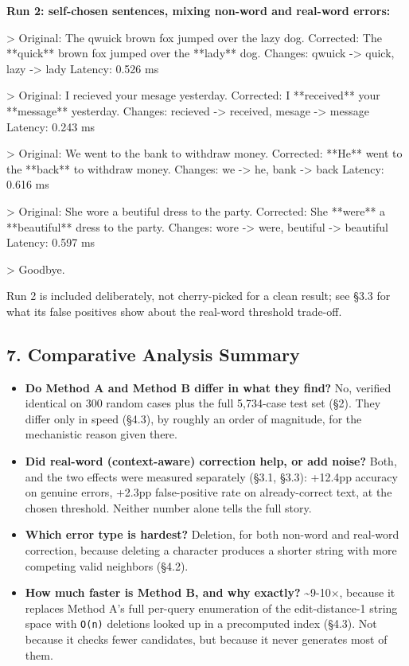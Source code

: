 \documentclass[11pt,a4paper]{article}
\begin{document}
\textbf{Run 2: self-chosen sentences, mixing non-word and real-word errors:}

\begin{codeblock}
> Original:  The qwuick brown fox jumped over the lazy dog.
Corrected: The **quick** brown fox jumped over the **lady** dog.
Changes: qwuick -> quick, lazy -> lady
Latency: 0.526 ms

> Original:  I recieved your mesage yesterday.
Corrected: I **received** your **message** yesterday.
Changes: recieved -> received, mesage -> message
Latency: 0.243 ms

> Original:  We went to the bank to withdraw money.
Corrected: **He** went to the **back** to withdraw money.
Changes: we -> he, bank -> back
Latency: 0.616 ms

> Original:  She wore a beutiful dress to the party.
Corrected: She **were** a **beautiful** dress to the party.
Changes: wore -> were, beutiful -> beautiful
Latency: 0.597 ms

> Goodbye.
\end{codeblock}

Run 2 is included deliberately, not cherry-picked for a clean result; see \S{}3.3 for what its false positives show about the real-word threshold trade-off.

\subsection*{7. Comparative Analysis Summary}

\begin{itemize}
\item \textbf{Do Method A and Method B differ in what they find?} No, verified identical on 300 random cases plus the full 5,734-case test set (\S{}2). They differ only in speed (\S{}4.3), by roughly an order of magnitude, for the mechanistic reason given there.
\item \textbf{Did real-word (context-aware) correction help, or add noise?} Both, and the two effects were measured separately (\S{}3.1, \S{}3.3): +12.4pp accuracy on genuine errors, +2.3pp false-positive rate on already-correct text, at the chosen threshold. Neither number alone tells the full story.
\item \textbf{Which error type is hardest?} Deletion, for both non-word and real-word correction, because deleting a character produces a shorter string with more competing valid neighbors (\S{}4.2).
\item \textbf{How much faster is Method B, and why exactly?} \textasciitilde{}9-10$\times$, because it replaces Method A's full per-query enumeration of the edit-distance-1 string space with \texttt{O(n)} deletions looked up in a precomputed index (\S{}4.3). Not because it checks fewer candidates, but because it never generates most of them.
\end{itemize}
\end{document}
